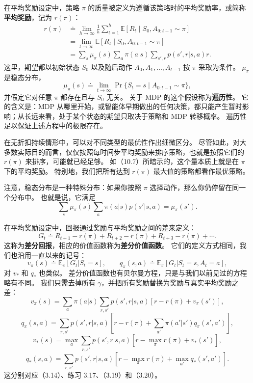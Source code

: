\documentclass[UTF8, 12pt, fontset=fandol, oneside]{ctexart}
\begin{document}
在平均奖励设定中，策略 $\pi$ 的质量被定义为遵循该策略时的平均奖励率，或简称\textbf{平均奖励}，记为 $r(\pi)$：
\begin{align}
r(\pi)
&\doteq \lim_{h\to\infty}\frac{1}{h}\sum_{t=1}^h \mathbb{E}\left[R_t\mid S_0,A_{0:t-1}\sim\pi\right] \tag{10.6}\\
&= \lim_{t\to\infty}\mathbb{E}\left[R_t\mid S_0,A_{0:t-1}\sim\pi\right] \tag{10.7}\\
&= \sum_s \mu_\pi(s)\sum_a\pi(a|s)\sum_{s',r}p(s',r|s,a)r.
\end{align}
这里，期望都以初始状态 $S_0$ 以及随后动作 $A_0,A_1,\ldots,A_{t-1}$ 按 $\pi$ 采取为条件。
$\mu_\pi$ 是稳态分布，
\[
\mu_\pi(s)\doteq \lim_{t\to\infty}\Pr\{S_t=s\mid A_{0:t-1}\sim\pi\},
\]
并假定它对任意 $\pi$ 都存在且与 $S_0$ 无关。
关于 MDP 的这个假设称为\textbf{遍历性}。
它的含义是：MDP 从哪里开始，或智能体早期做出的任何决策，都只能产生暂时影响；从长远来看，处于某个状态的期望只取决于策略和 MDP 转移概率。
遍历性足以保证上述方程中的极限存在。

在无折扣持续情形中，可以对不同类型的最优性作出细微区分。
尽管如此，对大多数实际目的而言，仅仅按照每时间步平均奖励来排序策略，也就是按照它们的 $r(\pi)$ 来排序，可能就已经足够。
如（10.7）所暗示的，这个量本质上就是在 $\pi$ 下的平均奖励。
特别地，我们把所有达到 $r(\pi)$ 最大值的策略都看作最优策略。

注意，稳态分布是一种特殊分布：如果你按照 $\pi$ 选择动作，那么你仍停留在同一个分布中。
也就是说，它满足
\begin{equation}
\sum_s\mu_\pi(s)\sum_a\pi(a|s)p(s'|s,a)=\mu_\pi(s').
\tag{10.8}
\end{equation}

在平均奖励设定中，回报通过奖励与平均奖励之间的差来定义：
\begin{equation}
G_t\doteq R_{t+1}-r(\pi)+R_{t+2}-r(\pi)+R_{t+3}-r(\pi)+\cdots.
\tag{10.9}
\end{equation}
这称为\textbf{差分回报}，相应的价值函数称为\textbf{差分价值函数}。
它们的定义方式相同，我们也沿用一直以来的记号：
\[
v_\pi(s)\doteq \mathbb{E}_\pi[G_t|S_t=s],\qquad
q_\pi(s,a)\doteq \mathbb{E}_\pi[G_t|S_t=s,A_t=a],
\]
对 $v_*$ 和 $q_*$ 也类似。
差分价值函数也有贝尔曼方程，只是与我们以前见过的方程略有不同。
我们只需去掉所有 $\gamma$，并把所有奖励替换为奖励与真实平均奖励之差：
\[
v_\pi(s)=\sum_a\pi(a|s)\sum_{r,s'}p(s',r|s,a)\left[r-r(\pi)+v_\pi(s')\right],
\]
\[
q_\pi(s,a)=\sum_{r,s'}p(s',r|s,a)\left[r-r(\pi)+\sum_{a'}\pi(a'|s')q_\pi(s',a')\right],
\]
\[
v_*(s)=\max_a\sum_{r,s'}p(s',r|s,a)\left[r-\max_\pi r(\pi)+v_*(s')\right],
\]
\[
q_*(s,a)=\sum_{r,s'}p(s',r|s,a)\left[r-\max_\pi r(\pi)+\max_{a'}q_*(s',a')\right].
\]
这分别对应（3.14）、练习 3.17、（3.19）和（3.20）。
\end{document}
